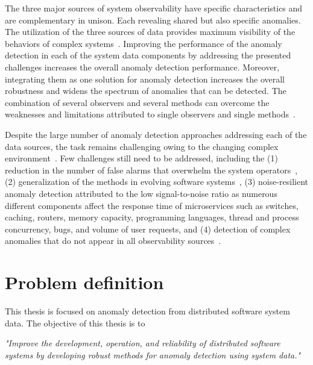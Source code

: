 The three major sources of system observability have specific characteristics and are complementary in unison. Each revealing shared but also specific anomalies. The utilization of the three sources of data provides maximum visibility of the behaviors of complex systems~\cite{sridharan2018distributed}. Improving the performance of the anomaly detection in each of the system data components by addressing the presented challenges increases the overall anomaly detection performance. Moreover, integrating them as one solution for anomaly detection increases the overall robustness and widens the spectrum of anomalies that can be detected. The combination of several observers and several methods can overcome the weaknesses and limitations attributed to single observers and single methods~\cite{JickTriangulation79,nedelkoski2019anomalymultimodal,nedelkoski2020data}.

Despite the large number of anomaly detection approaches addressing each of the data sources, the task remains challenging owing to the changing complex environment~\cite{gunawi2014bugs,cotroneo2019bad}. Few challenges still need to be addressed, including the (1) reduction in the number of false alarms that overwhelm the system operators~\cite{zhu2019tools,pang2020deep}, (2) generalization of the methods in evolving software systems~\cite{nedelkoski2020loganomaly, nedelkoski2020selfsupervised, zhang2019robust, meng2019loganomaly}, (3) noise-resilient anomaly detection attributed to the low signal-to-noise ratio as numerous different components affect the response time of microservices such as switches, caching, routers, memory capacity, programming languages, thread and process concurrency, bugs, and volume of user requests, and (4) detection of complex anomalies that do not appear in all observability sources~\cite{gunawi2014bugs,sillito2020failures,zhu2019tools}.


\section{Problem definition}\label{ch:introduction:sec:problemdefinition}
This thesis is focused on anomaly detection from distributed software system data. The objective of this thesis is to

\begin{center}
\emph{"Improve the development, operation, and reliability of distributed software systems by developing robust methods for anomaly detection using system data."}
\end{center}

